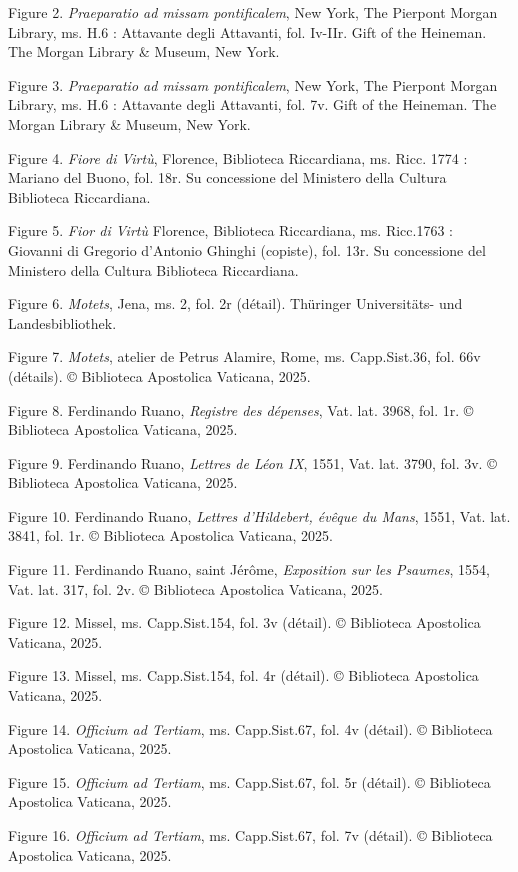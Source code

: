 \documentclass[12pt,twoside,openany]{book}
\begin{document}
Figure 2. \textit{Praeparatio ad missam pontificalem}, New York, The Pierpont Morgan Library, ms. H.6 : Attavante degli Attavanti, fol. Iv-IIr. Gift of the Heineman. The Morgan Library \& Museum, New York.

Figure 3. \textit{Praeparatio ad missam pontificalem}, New York, The Pierpont Morgan Library, ms. H.6 : Attavante degli Attavanti, fol. 7v. Gift of the Heineman. The Morgan Library \& Museum, New York.

Figure 4. \textit{Fiore di Virtù}, Florence, Biblioteca Riccardiana, ms. Ricc. 1774 : Mariano del Buono, fol. 18r. Su concessione del Ministero della Cultura Biblioteca Riccardiana.

Figure 5. \textit{Fior di Virtù} Florence, Biblioteca Riccardiana, ms. Ricc.1763 : Giovanni di Gregorio d’Antonio Ghinghi (copiste), fol. 13r. Su concessione del Ministero della Cultura Biblioteca Riccardiana.

Figure 6. \textit{Motets}, Jena, ms. 2, fol. 2r (détail). Thüringer Universitäts- und Landesbibliothek.

Figure 7. \textit{Motets}, atelier de Petrus Alamire, Rome, ms. Capp.Sist.36, fol. 66v (détails). © Biblioteca Apostolica Vaticana, 2025.

Figure 8. Ferdinando Ruano, \textit{Registre des dépenses}, Vat. lat. 3968, fol. 1r. © Biblioteca Apostolica Vaticana, 2025.

Figure 9. Ferdinando Ruano, \textit{Lettres de Léon IX}, 1551, Vat. lat. 3790, fol. 3v. © Biblioteca Apostolica Vaticana, 2025.

Figure 10. Ferdinando Ruano, \textit{Lettres d’Hildebert, évêque du Mans}, 1551, Vat. lat. 3841, fol. 1r. © Biblioteca Apostolica Vaticana, 2025.

Figure 11. Ferdinando Ruano, saint Jérôme, \textit{Exposition sur les Psaumes}, 1554, Vat. lat. 317, fol. 2v. © Biblioteca Apostolica Vaticana, 2025.

Figure 12. Missel, ms. Capp.Sist.154, fol. 3v (détail). © Biblioteca Apostolica Vaticana, 2025.

Figure 13. Missel, ms. Capp.Sist.154, fol. 4r (détail). © Biblioteca Apostolica Vaticana, 2025.

Figure 14. \textit{Officium ad Tertiam}, ms. Capp.Sist.67, fol. 4v (détail). © Biblioteca Apostolica Vaticana, 2025.

Figure 15. \textit{Officium ad Tertiam}, ms. Capp.Sist.67, fol. 5r (détail). © Biblioteca Apostolica Vaticana, 2025.

Figure 16.\textit{ Officium ad Tertiam}, ms. Capp.Sist.67, fol. 7v (détail). © Biblioteca Apostolica Vaticana, 2025.
\end{document}
